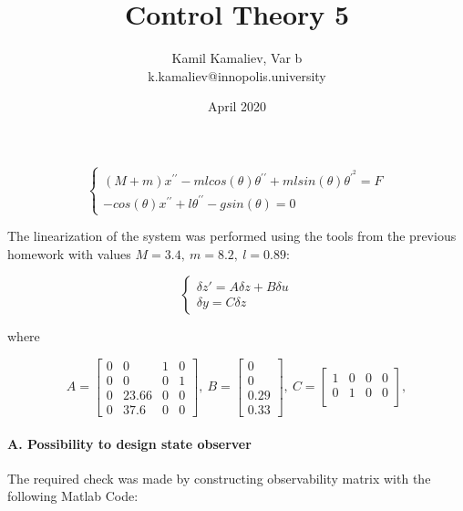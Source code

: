 \documentclass{article}
\title{Control Theory 5}
\author{Kamil Kamaliev, Var b \\ k.kamaliev@innopolis.university }
\date{April 2020}
\begin{document}
\maketitle

 $$
        \left\{ \begin{array}{ll} 
            (M+m)x^{\prime\prime}-mlcos(\theta)\theta^{\prime\prime}+mlsin(\theta)\theta^{\prime^2} = F\\
            -cos(\theta)x^{\prime\prime}+l\theta^{\prime\prime}-gsin(\theta) = 0
        \end{array} \right.
$$

The linearization of the system was performed using the tools from the previous homework with values $M = 3.4, \ m = 8.2, \ l = 0.89:$

         $$
        \left\{ \begin{array}{ll} 
            \delta z'= A \delta z + B \delta u\\
            \delta y = C \delta z
        \end{array} \right.
        $$
        
where

$$
A = \begin{bmatrix}
0 & 0 & 1 & 0 \\
0 & 0 & 0 & 1 \\
0 & 23.66 & 0 & 0 \\
0 & 37.6 & 0 & 0
\end{bmatrix}, \ 
B = \begin{bmatrix}
0 \\
0 \\
0.29 \\
0.33
\end{bmatrix}, \ 
C = \begin{bmatrix}
1 & 0 & 0 & 0 \\
0 & 1 & 0 & 0 \\
\end{bmatrix} ,
$$

\paragraph{A. Possibility to design state observer}

\leavevmode

\noindent
The required check was made by constructing observability matrix with the following Matlab Code:
 

\end{document}
